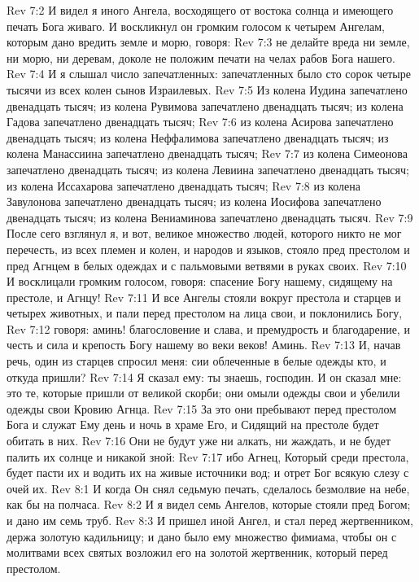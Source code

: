 \vs Rev 7:2 И видел я иного Ангела, восходящего от востока солнца и имеющего печать Бога живаго. И воскликнул он громким голосом к четырем Ангелам, которым дано вредить земле и морю, говоря:
\vs Rev 7:3 не делайте вреда ни земле, ни морю, ни деревам, доколе не положим печати на челах рабов Бога нашего.
\vs Rev 7:4 И я слышал число запечатленных: запечатленных было сто сорок четыре тысячи из всех колен сынов Израилевых.
\vs Rev 7:5 Из колена Иудина запечатлено двенадцать тысяч; из колена Рувимова запечатлено двенадцать тысяч; из колена Гадова запечатлено двенадцать тысяч;
\vs Rev 7:6 из колена Асирова запечатлено двенадцать тысяч; из колена Неффалимова запечатлено двенадцать тысяч; из колена Манассиина запечатлено двенадцать тысяч;
\vs Rev 7:7 из колена Симеонова запечатлено двенадцать тысяч; из колена Левиина запечатлено двенадцать тысяч; из колена Иссахарова запечатлено двенадцать тысяч;
\vs Rev 7:8 из колена Завулонова запечатлено двенадцать тысяч; из колена Иосифова запечатлено двенадцать тысяч; из колена Вениаминова запечатлено двенадцать тысяч.
\vs Rev 7:9 После сего взглянул я, и вот, великое множество людей, которого никто не мог перечесть, из всех племен и колен, и народов и языков, стояло пред престолом и пред Агнцем в белых одеждах и с пальмовыми ветвями в руках своих.
\vs Rev 7:10 И восклицали громким голосом, говоря: спасение Богу нашему, сидящему на престоле, и Агнцу!
\vs Rev 7:11 И все Ангелы стояли вокруг престола и старцев и четырех животных, и пали перед престолом на лица свои, и поклонились Богу,
\vs Rev 7:12 говоря: аминь! благословение и слава, и премудрость и благодарение, и честь и сила и крепость Богу нашему во веки веков! Аминь.
\vs Rev 7:13 И, начав речь, один из старцев спросил меня: сии облеченные в белые одежды кто, и откуда пришли?
\vs Rev 7:14 Я сказал ему: ты знаешь, господин. И он сказал мне: это те, которые пришли от великой скорби; они омыли одежды свои и убелили одежды свои Кровию Агнца.
\vs Rev 7:15 За это они пребывают  перед престолом Бога и служат Ему день и ночь в храме Его, и Сидящий на престоле будет обитать в них.
\vs Rev 7:16 Они не будут уже ни алкать, ни жаждать, и не будет палить их солнце и никакой зной:
\vs Rev 7:17 ибо Агнец, Который среди престола, будет пасти их и водить их на живые источники вод; и отрет Бог всякую слезу с очей их.
\vs Rev 8:1 И когда Он снял седьмую печать, сделалось безмолвие на небе, как бы на полчаса.
\vs Rev 8:2 И я видел семь Ангелов, которые стояли пред Богом; и дано им семь труб.
\vs Rev 8:3 И пришел иной Ангел, и стал перед жертвенником, держа золотую кадильницу; и дано было ему множество фимиама, чтобы он с молитвами всех святых возложил его на золотой жертвенник, который перед престолом.
